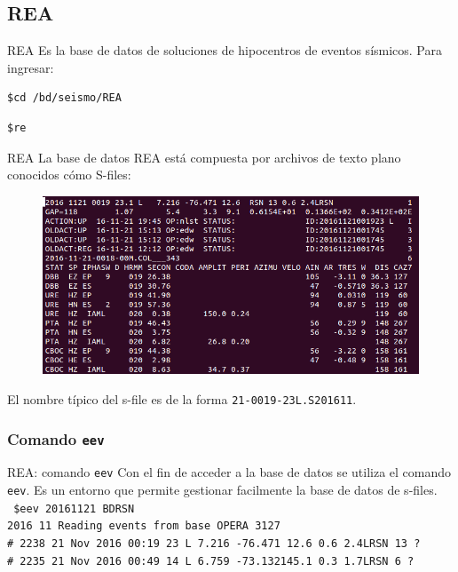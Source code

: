 \documentclass[11pt]{beamer}
\begin{document}
\subsection{REA}
\begin{frame}[fragile]{REA}
Es la base de datos de soluciones de hipocentros de eventos sísmicos. Para ingresar:\\
\begin{verbatim}
$cd /bd/seismo/REA
\end{verbatim}
\begin{verbatim}
$re
\end{verbatim}
\end{frame}

\begin{frame}{REA}
La base de datos REA está compuesta por archivos de texto plano conocidos cómo S-files:\\
\begin{center}
\begin{figure}
\includegraphics[scale=0.3]{sfile.png}
\end{figure}
\end{center}
El nombre típico del s-file es de la forma {\tt 21-0019-23L.S201611}.
\end{frame}
\subsubsection{Comando {\tt eev}}
\begin{frame}[fragile]{REA: comando {\tt eev}}
Con el fin de acceder a la base de datos se utiliza el comando {\tt eev}. Es un entorno que permite gestionar facilmente la base de datos de s-files.\\
{\scriptsize \tt
\$eev 20161121 BDRSN\\
2016 11 Reading events from base OPERA  3127\\ 
\# 2238 21 Nov 2016 00:19 23  L   7.216 -76.471 12.6    0.6 2.4LRSN   13  ?\\
\# 2235 21 Nov 2016 00:49 14  L   6.759 -73.132145.1    0.3 1.7LRSN    6  ?\\
}
\end{frame}
\end{document}
